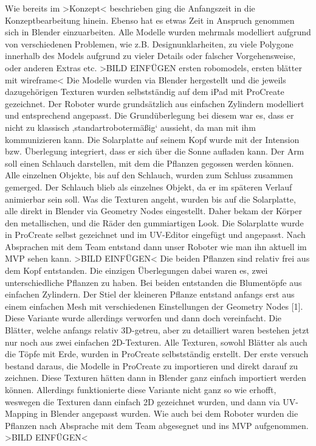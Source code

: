 Wie bereits im >Konzept< beschrieben ging die Anfangszeit in die Konzeptbearbeitung hinein. Ebenso hat es etwas Zeit in Anspruch genommen sich in Blender einzuarbeiten. Alle Modelle wurden mehrmals modelliert aufgrund von verschiedenen Problemen, wie z.B. Designunklarheiten, zu viele Polygone innerhalb des Models aufgrund zu vieler Details oder falscher Vorgehensweise, oder anderen Extras etc. >BILD EINFÜGEN ersten robomodels, ersten blätter mit wireframe<
Die Modelle wurden via Blender hergestellt und die jeweils dazugehörigen Texturen wurden selbstständig auf dem iPad mit ProCreate gezeichnet.
Der Roboter wurde grundsätzlich aus einfachen Zylindern modelliert und entsprechend angepasst. Die Grundüberlegung bei diesem war es, dass er nicht zu klassisch ‚standartrobotermäßig‘ aussieht, da man mit ihm kommunizieren kann. Die Solarplatte auf seinem Kopf wurde mit der Intension bzw. Überlegung integriert, dass er sich über die Sonne aufladen kann. Der Arm soll einen Schlauch darstellen, mit dem die Pflanzen gegossen werden können. Alle einzelnen Objekte, bis auf den Schlauch, wurden zum Schluss zusammen gemerged. Der Schlauch blieb als einzelnes Objekt, da er im späteren Verlauf animierbar sein soll. Was die Texturen angeht, wurden bis auf die Solarplatte, alle direkt in Blender via Geometry Nodes eingestellt. Daher bekam der Körper den metallischen, und die Räder den gummiartigen Look. Die Solarplatte wurde in ProCreate selbst gezeichnet und im UV-Editor eingefügt und angepasst. Nach Absprachen mit dem Team entstand dann unser Roboter wie man ihn aktuell im MVP sehen kann. >BILD EINFÜGEN< 
Die beiden Pflanzen sind relativ frei aus dem Kopf entstanden. Die einzigen Überlegungen dabei waren es, zwei unterschiedliche Pflanzen zu haben. Bei beiden entstanden die Blumentöpfe aus einfachen Zylindern. Der Stiel der kleineren Pflanze entstand anfangs erst aus einem einfachen Mesh mit verschiedenen Einstellungen der Geometry Nodes [1]. Diese Variante wurde allerdings verworfen und dann doch vereinfacht. Die Blätter, welche anfangs relativ 3D-getreu, aber zu detailliert waren bestehen jetzt nur noch aus zwei einfachen 2D-Texturen. Alle Texturen, sowohl Blätter als auch die Töpfe mit Erde, wurden in ProCreate selbstständig erstellt. Der erste versuch bestand daraus, die Modelle in ProCreate zu importieren und direkt darauf zu zeichnen. Diese Texturen hätten dann in Blender ganz einfach importiert werden können. Allerdings funktionierte diese Variante nicht ganz so wie erhofft, weswegen die Texturen dann einfach 2D gezeichnet wurden, und dann via UV-Mapping in Blender angepasst wurden. Wie auch bei dem Roboter wurden die Pflanzen nach Absprache mit dem Team abgesegnet und ins MVP aufgenommen. >BILD EINFÜGEN<
